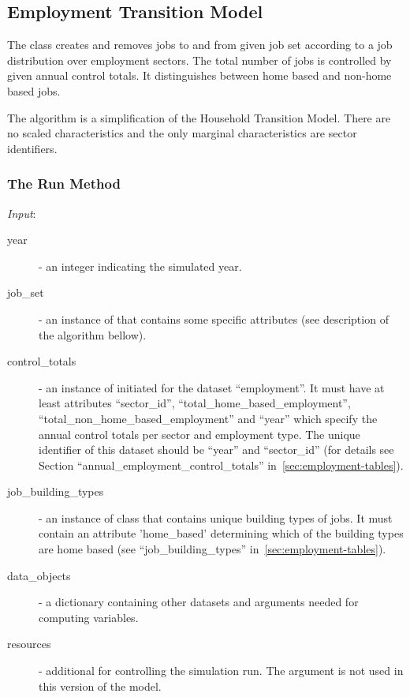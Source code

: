 %
\subsection{Employment Transition Model}
\modelsindex
%
\label{sec:employment-transition-model}

The class  creates and removes jobs to and
from given job set according to a job distribution over employment sectors.
The total number of jobs is controlled by given annual control totals. It
distinguishes between home based and non-home based jobs.

The algorithm is a simplification of the Household Transition Model. There are
no scaled characteristics and the only marginal characteristics are sector
identifiers.

\subsubsection{The Run Method}
%
{\it Input}:
\begin{description}
\item[year] - an integer indicating the simulated year.
\item[job_set] - an instance of  that contains some
  specific attributes (see description of the algorithm bellow).
\item[control_totals] - an instance of  initiated for
  the dataset ``employment''. It must have at least attributes ``sector_id'',
  ``total_home_based_employment'', ``total_non_home_based_employment'' and
  ``year'' which specify the annual control totals per sector and employment
  type.  The unique identifier of this dataset should be ``year'' and
  ``sector_id'' (for details see Section ``annual_employment_control_totals''
  in~\ref{sec:employment-tables}).
\item[job_building_types] - an instance of class  that contains unique 
building types of jobs. It must contain an attribute 'home_based' determining which 
of the building types are home based (see ``job_building_types'' in~\ref{sec:employment-tables}).
 \item[data_objects] - a dictionary containing other datasets and arguments
  needed for computing variables.
\item[resources] - additional  for controlling the
  simulation run. The argument is not used in this version of the model. 
\end{description}


